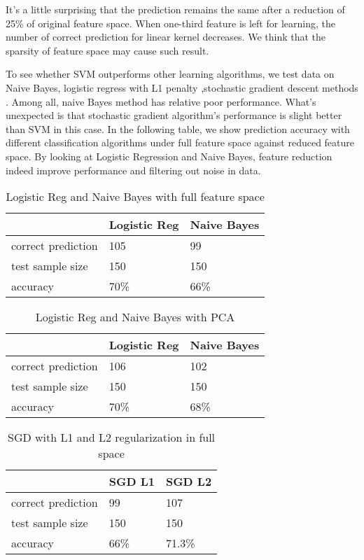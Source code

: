 \documentclass[11pt,letterpaper]{article}
\begin{document}
It's a little surprising that the prediction remains the same after a reduction of 25\% of original feature space. When one-third feature is left for learning, the number of correct prediction for linear kernel decreases. We think that the sparsity of feature space may cause such result. 

To see whether SVM outperforms other learning algorithms, we test data on Naive Bayes, logistic regress with L1 penalty ,stochastic gradient descent methods . Among all,  naive Bayes method has relative poor performance. What's unexpected is that stochastic gradient algorithm's performance is slight better than SVM in this case. In the following table, we show prediction accuracy with different classification algorithms under full feature space against reduced feature space. By looking at Logistic Regression and Naive Bayes, feature reduction indeed improve performance and filtering out noise in data. 
\begin{center}
   \begin{table}[h]
    \begin{tabular}{ | l | l  | p{2cm} |}
    \hline
     & Logistic Reg & Naive Bayes \\ \hline
    correct prediction& 105 & 99  \\ \hline
    test sample size& 150 &150  \\ \hline
    accuracy & 70\% &66\%\\ \hline
    \end{tabular}
    \caption{ Logistic Reg and Naive Bayes with full feature space}
    \end{table}
\end{center}

\begin{center}
   \begin{table}[h]
    \begin{tabular}{ | l | l  | p{2cm} |}
    \hline
     & Logistic Reg & Naive Bayes \\ \hline
    correct prediction& 106 & 102  \\ \hline
    test sample size& 150 &150  \\ \hline
    accuracy & 70\% &68\%\\ \hline
    \end{tabular}
    \caption{Logistic Reg and Naive Bayes with PCA}
    \end{table}
\end{center}

\begin{center}
   \begin{table}[t]
    \begin{tabular}{ | l | l  | p{2cm} |}
    \hline
     & SGD L1& SGD L2 \\ \hline
    correct prediction& 99 & 107  \\ \hline
    test sample size& 150 &150  \\ \hline
    accuracy & 66\% &71.3\%\\ \hline
    \end{tabular}
    \caption{SGD with L1 and L2 regularization in full space}
    \end{table}
\end{center}
\end{document}
